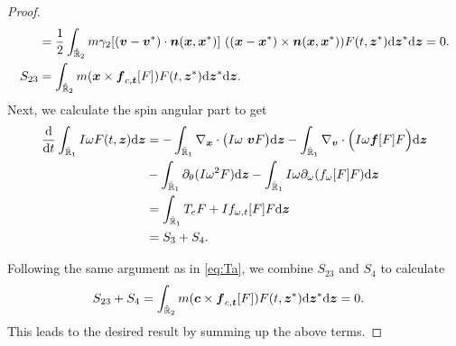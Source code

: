 \documentclass[a4paper,11pt]{article}
\numberwithin{equation}{section}
\theoremstyle{definition}
\newcommand{\bfx}{\boldsymbol{x}}
\newcommand{\bfz}{\boldsymbol{z}}
\newcommand{\bfv}{\boldsymbol{v}}
\newcommand{\bfn}{\boldsymbol{n}}
\newcommand{\bft}{\boldsymbol{t}}
\newcommand{\bff}{\boldsymbol{f}}
\newcommand{\bfc}{\boldsymbol{c}}
\newcommand{\bbr}{\mathbb R}
\def\d{{  \rm d}}
\begin{document}
\begin{proof}
\begin{align*}
&=  \frac12\int_{\hat{\bbr}_2}m\gamma_2 [ (\bfv  - \bfv^*) \cdot \bfn(\bfx, \bfx^*)]  \ ((\bfx-\bfx^*)\times \bfn(\bfx, \bfx^*))     F(t, \bfz^*)\d\bfz^*\d \bfz=0. \\
%
S_{23} 
&= \int_{\hat{\bbr}_2}  m(\bfx\times  \bff_{c, \bft}[F])F(t, \bfz^*) \d\bfz^*\d \bfz. 
\end{align*}
Next, we calculate the spin angular part to get
\begin{align*}
\frac{\d}{\d t} \int_{\hat{\bbr}_1}I \omega F(t,\bfz) \d \bfz 
&=- \int_{\hat{\bbr}_1}\nabla_{\bfx} \cdot \big (I \omega\ \bfv F \big)  \d\bfz
-  \int_{\hat{\bbr}_1}\nabla_{\bfv} \cdot  \Big ( I \omega\bff[F] F  \Big ) \d\bfz\\
&-\int_{\hat{\bbr}_1}\partial_\theta (I \omega^2 F) \d\bfz
- \int_{\hat{\bbr}_1} I \omega \partial_{\omega} ( f_{\omega}[F] F)\d\bfz\\
&=\int_{\hat{\bbr}_1} T_e F  + I f_{\omega,t}[F] F\d\bfz\\
&= S_3+S_4.
\end{align*}

%
Following the same argument as in \eqref{eq:Ta}, we combine $S_{23}$ and $S_4$ to calculate 
\begin{align*}
S_{23} + S_4 
&= \int_{\hat{\bbr}_2}  m(\bfc\times  \bff_{c, \bft}[F])F(t, \bfz^*) \d\bfz^*\d \bfz=0.
\end{align*}
This leads to the desired result by summing up the above terms.


\end{proof}
\end{document}
